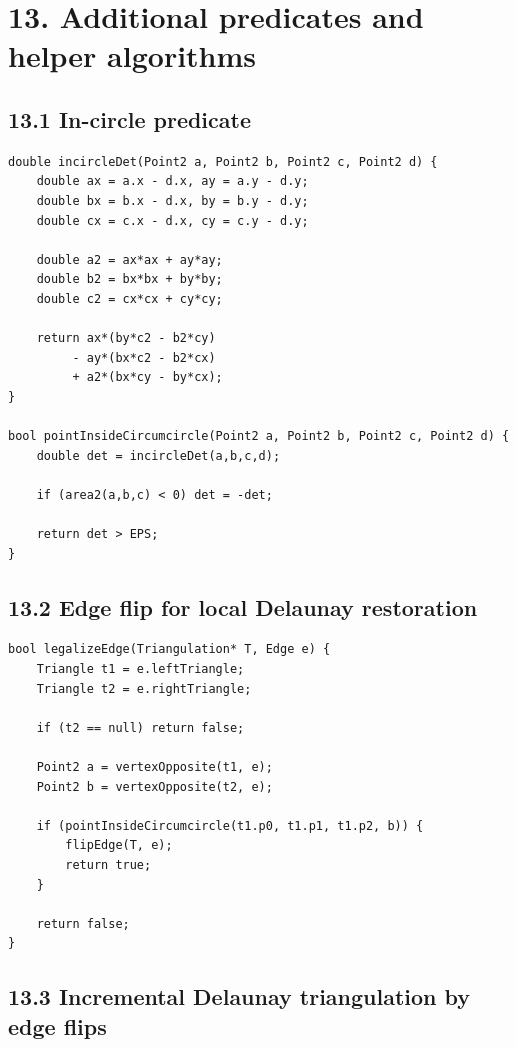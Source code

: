 \documentclass[11pt]{article}
\begin{document}
\section{13. Additional predicates and helper
algorithms}\label{additional-predicates-and-helper-algorithms}

\subsection{13.1 In-circle predicate}\label{in-circle-predicate}

\begin{verbatim}
double incircleDet(Point2 a, Point2 b, Point2 c, Point2 d) {
    double ax = a.x - d.x, ay = a.y - d.y;
    double bx = b.x - d.x, by = b.y - d.y;
    double cx = c.x - d.x, cy = c.y - d.y;

    double a2 = ax*ax + ay*ay;
    double b2 = bx*bx + by*by;
    double c2 = cx*cx + cy*cy;

    return ax*(by*c2 - b2*cy)
         - ay*(bx*c2 - b2*cx)
         + a2*(bx*cy - by*cx);
}

bool pointInsideCircumcircle(Point2 a, Point2 b, Point2 c, Point2 d) {
    double det = incircleDet(a,b,c,d);

    if (area2(a,b,c) < 0) det = -det;

    return det > EPS;
}
\end{verbatim}

\subsection{13.2 Edge flip for local Delaunay
restoration}\label{edge-flip-for-local-delaunay-restoration}

\begin{verbatim}
bool legalizeEdge(Triangulation* T, Edge e) {
    Triangle t1 = e.leftTriangle;
    Triangle t2 = e.rightTriangle;

    if (t2 == null) return false;

    Point2 a = vertexOpposite(t1, e);
    Point2 b = vertexOpposite(t2, e);

    if (pointInsideCircumcircle(t1.p0, t1.p1, t1.p2, b)) {
        flipEdge(T, e);
        return true;
    }

    return false;
}
\end{verbatim}

\subsection{13.3 Incremental Delaunay triangulation by edge
flips}\label{incremental-delaunay-triangulation-by-edge-flips}
\end{document}
